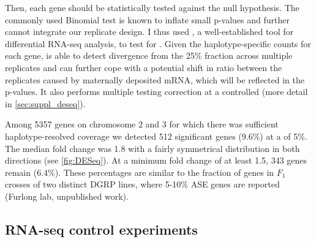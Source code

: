 
Then, each gene should be statistically tested against the null
hypothesis. The commonly used Binomial test is known to inflate small p-values
\citep{Harvey2014} and further cannot integrate our replicate design. I thus
used \deseq, a well-established tool for differential RNA-seq analysis, to test
for \ase. Given the haplotype-specific counts for each gene, \deseq is able to
detect divergence from the 25\% fraction across multiple replicates and can
further cope with a potential shift in \ase ratio between the replicates caused
by maternally deposited mRNA, which will be reflected in the p-values. It also performs
multiple testing correction at a controlled \fdr (more detail in
\cref{sec:suppl_deseq}).

Among 5357 genes on chromosome 2 and 3 for which there was sufficient
haplotype-resolved coverage we detected 512 significant \ase genes (9.6\%) at a
\fdr of 5\%. The median fold change was 1.8 with a fairly symmetrical distribution in
both directions (see \cref{fig:DESeq}). At a minimum fold change of at least
1.5, 343 genes remain (6.4\%). These percentages are similar to the fraction of
\ase genes in $F_1$ crosses of two distinct DGRP lines, where 5-10\% ASE genes
are reported (Furlong lab, unpublished work).






\subsection{RNA-seq control experiments}
\label{sec:balancer_ase_controls}

